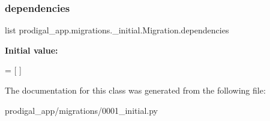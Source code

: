 \subsubsection{\texorpdfstring{dependencies}{dependencies}}
{\footnotesize\ttfamily list prodigal\+\_\+app.\+migrations.\+\_\+initial.\+Migration.\+dependencies\hspace{0.3cm}{\ttfamily [static]}}

{\bfseries Initial value\+:}
\begin{DoxyCode}
=  [
    ]
\end{DoxyCode}


The documentation for this class was generated from the following file\+:\begin{DoxyCompactItemize}
\item 
prodigal\+\_\+app/migrations/0001\+\_\+initial.\+py\end{DoxyCompactItemize}
